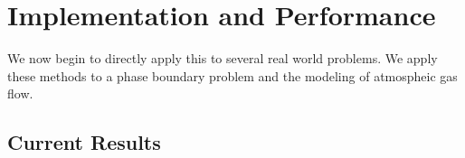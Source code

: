 \section{Implementation and Performance}

We now begin to directly apply this to several real world problems.
We apply these methods to a phase boundary problem and the modeling of atmospheic gas flow.

\subsection{Current Results}

